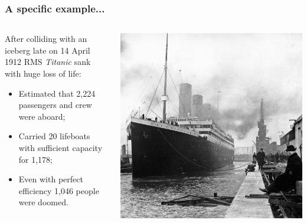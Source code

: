 \documentclass[aspectratio=169]{beamer}
\begin{document}
\begin{frame}
\frametitle{A specific example...}
\begin{columns}

\begin{column}{0.5\textwidth}
After colliding with an iceberg late on 14 April 1912 RMS \textit{Titanic} sank with huge loss of life:
\bigskip
\begin{itemize}
\item Estimated that 2,224 passengers and crew were aboard;
\bigskip
\item Carried 20 lifeboats with sufficient capacity for 1,178;
\bigskip
\item<2-> Even with perfect efficiency 1,046 people were doomed.
\bigskip
\end{itemize}

\end{column}

\begin{column}{0.5\textwidth}  %
    \begin{center}
     \includegraphics[scale=0.12]{1280px-Titanic.jpg}
     \end{center}
\end{column}

\end{columns}
\end{frame}
\end{document}
